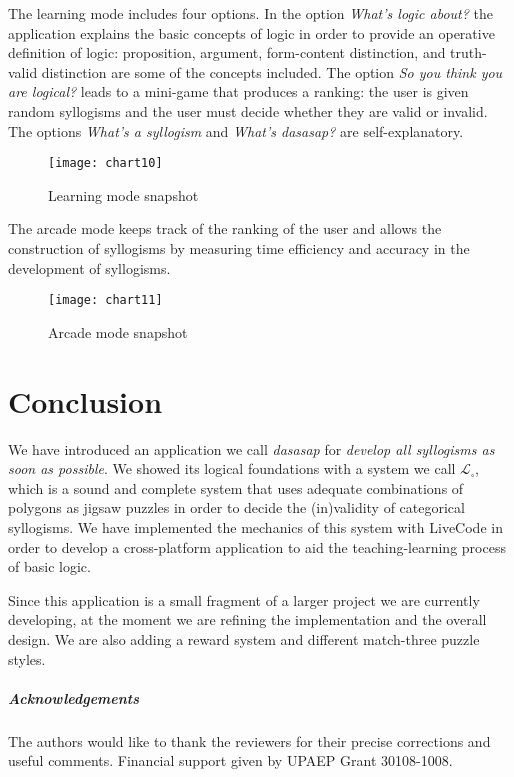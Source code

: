 \documentclass[a4paper,UKenglish]{lipics}
\begin{document}
The learning mode includes four options. In the option \textit{What's logic about?} the application explains the basic concepts of logic in order to provide an operative definition of logic: proposition, argument, form-content distinction, and  truth-valid distinction are some of the concepts included. The option \textit{So you think you are logical?} leads to a mini-game that produces a ranking: the user is given random syllogisms and the user must decide whether they are valid or invalid. The options \textit{What's a syllogism} and \textit{What's dasasap?} are self-explanatory. 

\begin{figure}[h]
  \texttt{[image: chart10]}
  \caption{Learning mode snapshot}  
  \label{fig:12}
\end{figure}

The arcade mode keeps track of the ranking of the user and allows the construction of syllogisms by measuring time efficiency and accuracy in the development of syllogisms.

\begin{figure}[h]
  \texttt{[image: chart11]}
  \caption{Arcade mode snapshot}  
  \label{fig:13}
\end{figure}



\section{Conclusion}
\label{sec:3}
We have introduced an application we call \textit{dasasap} for \textit{develop all syllogisms as soon as possible}. We showed its logical foundations with a system we call $\mathcal{L}_\square$, which is a sound and complete system that uses adequate combinations of polygons as jigsaw puzzles in order to decide the (in)validity of categorical syllogisms. We have implemented the mechanics of this system with LiveCode in order to develop a cross-platform application to aid the teaching-learning process of basic logic. 

Since this application is a small fragment of a larger project we are currently developing, at the moment we are refining the implementation and the overall design. We are also adding a reward system and different match-three puzzle styles.    

\subparagraph*{Acknowledgements}
The authors would like to thank the reviewers for their precise corrections and useful comments. Financial support given by UPAEP Grant 30108-1008.
\end{document}
